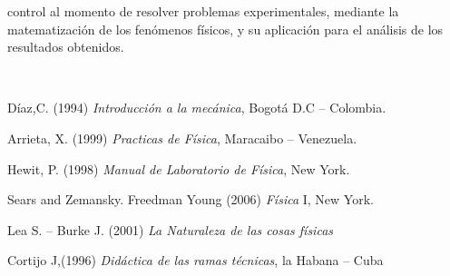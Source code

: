 \begin{titlepage}
\begin{minipage}{0.85\linewidth}
\begin{minipage}{0.85\linewidth}
\begin{resumen}
control al momento de resolver problemas experimentales, mediante la
matematizaci\'on de los fen\'omenos f\'isicos, y su aplicaci\'on para el an\'alisis de
los resultados obtenidos.
    \end{resumen}
\end{minipage}
\vspace*{5pt}\\
\footnotesize
%  
    
\end{minipage}
\vspace{5pt}
\begin{thebibliography}{99}
D\'iaz\textsc{,C.} (1994) \textit{Introducci\'on a la mec\'anica},
Bogot\'a D.C -- Colombia.

Arrieta, X. (1999) \textit{Practicas de F\'isica}, Maracaibo
-- Venezuela.

Hewit, P. (1998) \textit{Manual de Laboratorio de F\'isica}, New York.

Sears and Zemansky. Freedman Young (2006) \textit{F\'isica} I,
New York.

Lea S. -- Burke J. (2001) \textit{La Naturaleza de las cosas
f\'isicas}

Cortijo J,(1996) \textit{Did\'actica de las ramas t\'ecnicas},
la Habana -- Cuba
\
\end{thebibliography}
\end{titlepage}
